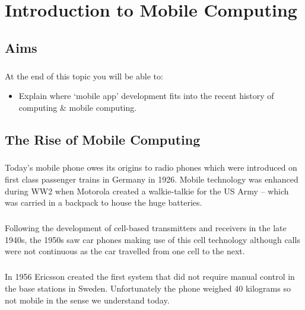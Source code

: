 \chapter{Introduction to Mobile Computing} 

\section{Aims}
\paragraph{} At the end of this topic you will be able to:

\begin{itemize}
\item Explain where ‘mobile app’ development fits into the recent history of computing \& mobile computing. 
\end{itemize}


\section{The Rise of Mobile Computing}
\paragraph{} Today's mobile phone owes its origins to radio phones which were introduced on first class passenger trains in Germany in 1926. Mobile technology was enhanced during WW2 when Motorola created a walkie-talkie for the US Army – which was carried in a backpack to house the huge batteries.

\paragraph{} Following the development of cell-based transmitters and receivers in the late 1940s, the 1950s saw car phones making use of this cell technology although calls were not continuous as the car travelled from one cell to the next.

\paragraph{} In 1956 Ericsson created the first system that did not require manual control in the base stations in Sweden. Unfortunately the phone weighed 40 kilograms so not mobile in the sense we understand today.

